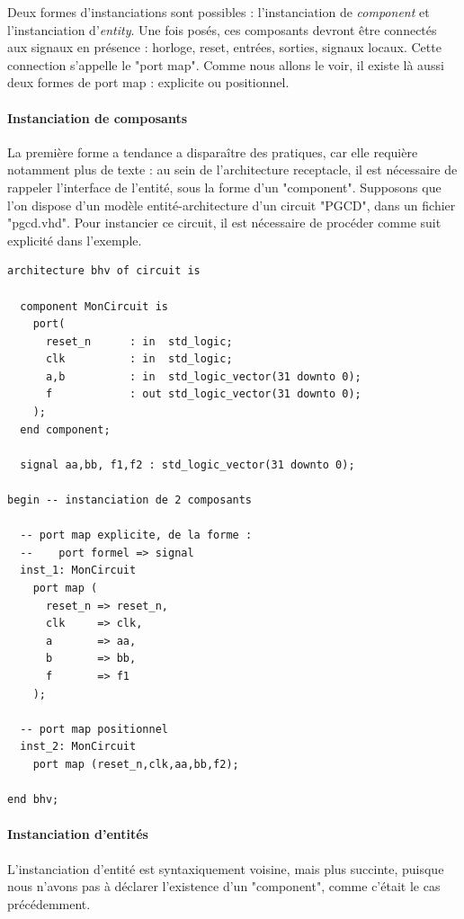 Deux formes d'instanciations sont possibles : l'instanciation de {\it component} et l'instanciation d'{\it entity}. Une fois posés, ces composants devront être connectés aux signaux
en présence : horloge, reset, entrées, sorties, signaux locaux. Cette connection s'appelle le "port map". Comme nous allons le voir, il existe là aussi deux formes de port map : explicite ou positionnel.

\paragraph{Instanciation de composants}
La première forme a tendance a disparaître des pratiques, car elle requière notamment plus de texte : au sein de l'architecture receptacle, il est nécessaire de rappeler l'interface de l'entité, sous la forme
d'un "component". Supposons que l'on dispose d'un modèle entité-architecture d'un circuit "PGCD", dans un fichier "pgcd.vhd". Pour instancier ce circuit, il est nécessaire de procéder comme suit explicité dans
l'exemple.

\begin{lstlisting}[frame=single]
architecture bhv of circuit is

  component MonCircuit is
    port(
      reset_n      : in  std_logic;
      clk          : in  std_logic;
      a,b          : in  std_logic_vector(31 downto 0);
      f            : out std_logic_vector(31 downto 0);
    );
  end component;

  signal aa,bb, f1,f2 : std_logic_vector(31 downto 0);

begin -- instanciation de 2 composants

  -- port map explicite, de la forme :
  --    port formel => signal
  inst_1: MonCircuit
    port map (
      reset_n => reset_n,
      clk     => clk,
      a       => aa,
      b       => bb,
      f       => f1
    );

  -- port map positionnel
  inst_2: MonCircuit
    port map (reset_n,clk,aa,bb,f2);

end bhv;
\end{lstlisting}

\paragraph{Instanciation d'entités}

L'instanciation d'entité est syntaxiquement voisine, mais plus succinte, puisque nous n'avons pas à déclarer l'existence d'un "component", comme c'était le cas
précédemment.

